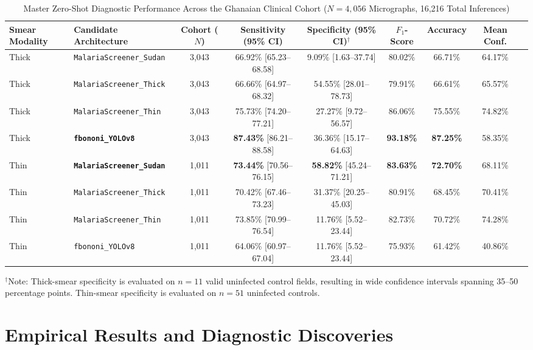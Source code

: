 \documentclass[10pt,journal,compsoc]{IEEEtran}
\begin{document}
\begin{table}[htbp]
\caption{Master Zero-Shot Diagnostic Performance Across the Ghanaian Clinical Cohort ($N=4,056$ Micrographs, 16,216 Total Inferences)}
\label{tab:master_results}
\centering
\begin{tabular}{llccccccc}
\toprule
\textbf{Smear Modality} & \textbf{Candidate Architecture} & \textbf{Cohort ($N$)} & \textbf{Sensitivity (95\% CI)} & \textbf{Specificity (95\% CI)$^\dagger$} & \textbf{$F_1$-Score} & \textbf{Accuracy} & \textbf{Mean Conf.} \\
\midrule
Thick & \texttt{MalariaScreener\_Sudan} & 3,043 & 66.92\% [65.23--68.58] & 9.09\% [1.63--37.74] & 80.02\% & 66.71\% & 64.17\% \\
Thick & \texttt{MalariaScreener\_Thick} & 3,043 & 66.66\% [64.97--68.32] & 54.55\% [28.01--78.73] & 79.91\% & 66.61\% & 65.57\% \\
Thick & \texttt{MalariaScreener\_Thin} & 3,043 & 75.73\% [74.20--77.21] & 27.27\% [9.72--56.57] & 86.06\% & 75.55\% & 74.82\% \\
Thick & \textbf{\texttt{fbononi\_YOLOv8}} & 3,043 & \textbf{87.43\%} [86.21--88.58] & 36.36\% [15.17--64.63] & \textbf{93.18\%} & \textbf{87.25\%} & 58.35\% \\
\midrule
Thin & \textbf{\texttt{MalariaScreener\_Sudan}} & 1,011 & \textbf{73.44\%} [70.56--76.15] & \textbf{58.82\%} [45.24--71.21] & \textbf{83.63\%} & \textbf{72.70\%} & 68.11\% \\
Thin & \texttt{MalariaScreener\_Thick} & 1,011 & 70.42\% [67.46--73.23] & 31.37\% [20.25--45.03] & 80.91\% & 68.45\% & 70.41\% \\
Thin & \texttt{MalariaScreener\_Thin} & 1,011 & 73.85\% [70.99--76.54] & 11.76\% [5.52--23.44] & 82.73\% & 70.72\% & 74.28\% \\
Thin & \texttt{fbononi\_YOLOv8} & 1,011 & 64.06\% [60.97--67.04] & 11.76\% [5.52--23.44] & 75.93\% & 61.42\% & 40.86\% \\
\bottomrule
\end{tabular}
\flushleft
\footnotesize{$^\dagger$Note: Thick-smear specificity is evaluated on $n=11$ valid uninfected control fields, resulting in wide confidence intervals spanning 35--50 percentage points. Thin-smear specificity is evaluated on $n=51$ uninfected controls.}
\end{table}

\section{Empirical Results and Diagnostic Discoveries}
\end{document}
